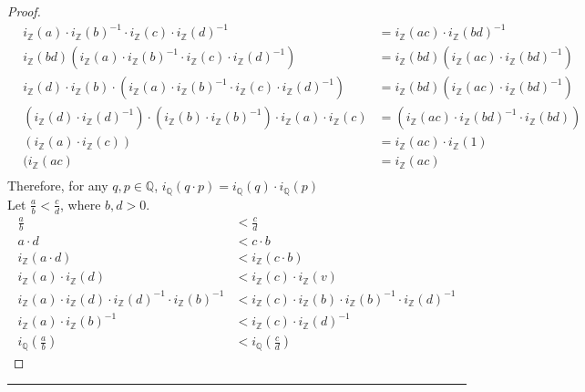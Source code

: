 \documentclass[openany, amssymb, psamsfonts]{amsart}
\newcommand{\bbQ}{\mathbb{Q}}
\newcommand{\bbZ}{\mathbb{Z}}
\theoremstyle{definition}
\numberwithin{equation}{section}
\begin{document}
\begin{proof}
\begin{align*}
    \tag{By Construction:}\;\;\; i_\bbZ(a) \cdot i_\bbZ(b)^{-1} \cdot i_\bbZ(c) \cdot i_\bbZ(d)^{-1} &= i_\bbZ(ac)\cdot i_\bbZ(bd)^{-1}\\
    \tag{Multiplicative Inv:}\;\;\; i_\bbZ(bd)(i_\bbZ(a) \cdot i_\bbZ(b)^{-1} \cdot i_\bbZ(c) \cdot i_\bbZ(d)^{-1}) &= i_\bbZ(bd)(i_\bbZ(ac)\cdot i_\bbZ(bd)^{-1})\\
    \tag{By Construction:}\;\;\; i_\bbZ(d)\cdot i_\bbZ(b) \cdot (i_\bbZ(a) \cdot i_\bbZ(b)^{-1} \cdot i_\bbZ(c) \cdot i_\bbZ(d)^{-1}) &= i_\bbZ(bd)(i_\bbZ(ac)\cdot i_\bbZ(bd)^{-1})\\
    \tag{Comm. and Dist:}\;\;\; (i_\bbZ(d)\cdot i_\bbZ(d)^{-1}) \cdot (i_\bbZ(b)\cdot i_\bbZ(b)^{-1}) \cdot i_\bbZ(a) \cdot i_\bbZ(c)&= (i_\bbZ(ac)\cdot i_\bbZ(bd)^{-1} \cdot i_\bbZ(bd))\\
    \tag{By Inverses}\;\;\; (i_\bbZ(a) \cdot i_\bbZ(c)) &= i_\bbZ(ac)\cdot i_\bbZ(1)\\
    \tag{By Construction}\;\;\; (i_\bbZ(ac)&= i_\bbZ(ac)\\
\end{align*}
Therefore, for any $q,p \in \bbQ$, $i_\bbQ(q\cdot p) = i_\bbQ(q) \cdot i_\bbQ(p)$\\
Let $\frac{a}{b} < \frac{c}{d}$, where $b, d > 0$. 
\begin{align*}
   \frac{a}{b}&< \frac{c}{d}\\
    \tag{3.8}  a\cdot d &< c\cdot b\\
    \tag{By Construction} i_{\bbZ}(a \cdot d)  &< i_{\bbZ}(c \cdot b)\\
    \tag{By Construction} i_{\bbZ}(a) \cdot i_{\bbZ}(d) &< i_{\bbZ}(c) \cdot i_{\bbZ}(v)\\
    \tag{Associativity} i_{\bbZ}(a) \cdot i_{\bbZ}(d) \cdot i_{\bbZ}(d)^{-1} \cdot i_{\bbZ}(b)^{-1} &< i_{\bbZ}(c) \cdot i_{\bbZ}(b) \cdot i_{\bbZ}(b)^{-1} \cdot i_{\bbZ}(d)^{-1}\\
    \tag{Identity Element} i_{\bbZ}(a) \cdot i_{\bbZ}(b)^{-1} &< i_{\bbZ}(c)\cdot i_{\bbZ}(d)^{-1}\\
    \tag{By Construction} i_\bbQ(\frac{a}{b}) &< i_\bbQ(\frac{c}{d})
\end{align*}

\end{proof}
\vspace{4pt}     \hrule   \vspace{4pt}
\end{document}

